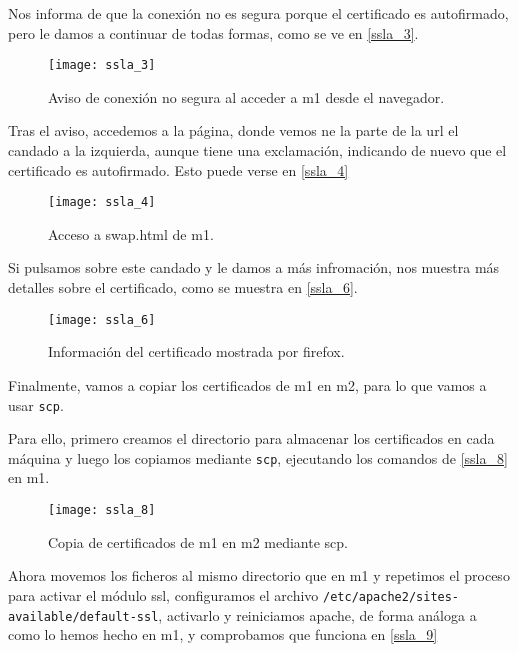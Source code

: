 Nos informa de que la conexión no es segura porque el certificado es autofirmado, pero le damos a continuar de todas formas, como se ve en \eqref{ssla_3}.

\begin{figure}[h!]
\begin{center}
\caption{Aviso de conexión no segura al acceder a m1 desde el navegador.}
\label{ssla_3}
\texttt{[image: ssla\_3]}
\end{center}
\end{figure}

Tras el aviso, accedemos a la página, donde vemos ne la parte de la url el candado a la izquierda, aunque tiene una exclamación, indicando de nuevo que el certificado es autofirmado. Esto puede verse en \eqref{ssla_4}

\begin{figure}[h!]
\begin{center}
\caption{Acceso a swap.html de m1.}
\label{ssla_4}
\texttt{[image: ssla\_4]}
\end{center}
\end{figure}

Si pulsamos sobre este candado y le damos a más infromación, nos muestra más detalles sobre el certificado, como se muestra en \eqref{ssla_6}.

\begin{figure}[h!]
\begin{center}
\caption{Información del certificado mostrada por firefox.}
\label{ssla_6}
\texttt{[image: ssla\_6]}
\end{center}
\end{figure}

Finalmente, vamos a copiar los certificados de m1 en m2, para lo que vamos a usar \verb|scp|.

Para ello, primero creamos el directorio para almacenar los certificados en cada máquina y luego los copiamos mediante \verb|scp|, ejecutando los comandos de \eqref{ssla_8} en m1.

\begin{figure}[h!]
\begin{center}
\caption{Copia de certificados de m1 en m2 mediante scp.}
\label{ssla_8}
\texttt{[image: ssla\_8]}
\end{center}
\end{figure}

Ahora movemos los ficheros al mismo directorio que en m1 y repetimos el proceso para activar el módulo ssl, configuramos el archivo \verb|/etc/apache2/sites-available/default-ssl|, activarlo y reiniciamos apache, de forma análoga a como lo hemos hecho en m1, y comprobamos que funciona en \eqref{ssla_9}

